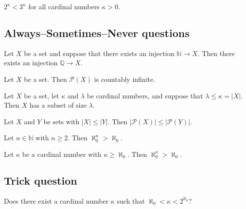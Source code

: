 \begin{chapex} %
\label{cqInfinityTFEnd}
$2^{\kappa} < 3^{\kappa}$ for all cardinal numbers $\kappa > 0$.
\end{chapex}

\subsection*{Always--Sometimes--Never questions}


\begin{chapex} %
\label{cqInfinityASNBegin}
Let $X$ be a set and suppose that there exists an injection $\mathbb{N} \to X$. Then there exists an injection $\mathbb{Q} \to X$.
\end{chapex}

\begin{chapex} %
Let $X$ be a set. Then $\mathcal{P}(X)$ is countably infinite.
\end{chapex}

\begin{chapex} %
Let $X$ be a set, let $\kappa$ and $\lambda$ be cardinal numbers, and suppose that $\lambda \le \kappa = |X|$. Then $X$ has a subset of size $\lambda$.
\end{chapex}

\begin{chapex} %
Let $X$ and $Y$ be sets with $|X| \le |Y|$. Then $|\mathcal{P}(X)| \le |\mathcal{P}(Y)|$.
\end{chapex}

\begin{chapex} %
Let $n \in \mathbb{N}$ with $n \ge 2$. Then $\aleph_0^n > \aleph_0$.
\end{chapex}

\begin{chapex} %
\label{cqInfinityASNEnd}
Let $\kappa$ be a cardinal number with $\kappa \ge \aleph_0$. Then $\aleph_0^{\kappa} > \aleph_0$.
\end{chapex}

\subsection*{Trick question}

\begin{chapex}
\label{cqContinuumHypothesis}
Does there exist a cardinal number $\kappa$ such that $\aleph_0 < \kappa < 2^{\aleph_0}$?
\end{chapex}